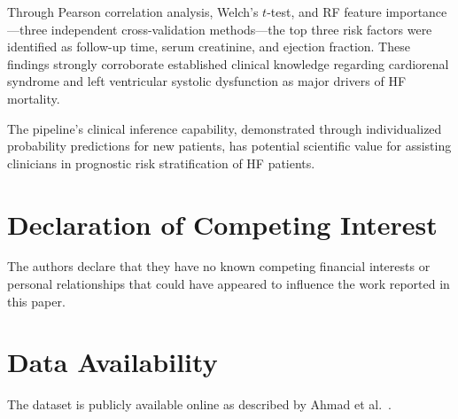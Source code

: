 \documentclass[12pt,a4paper]{article}
\begin{document}
Through Pearson correlation analysis, Welch's $t$-test, and RF feature importance---three independent cross-validation methods---the top three risk factors were identified as follow-up time, serum creatinine, and ejection fraction. These findings strongly corroborate established clinical knowledge regarding cardiorenal syndrome and left ventricular systolic dysfunction as major drivers of HF mortality.

The pipeline's clinical inference capability, demonstrated through individualized probability predictions for new patients, has potential scientific value for assisting clinicians in prognostic risk stratification of HF patients.

\section*{Declaration of Competing Interest}

The authors declare that they have no known competing financial interests or personal relationships that could have appeared to influence the work reported in this paper.

\section*{Data Availability}

The dataset is publicly available online as described by Ahmad et al.\ \citep{ahmad2017}.


\end{document}
